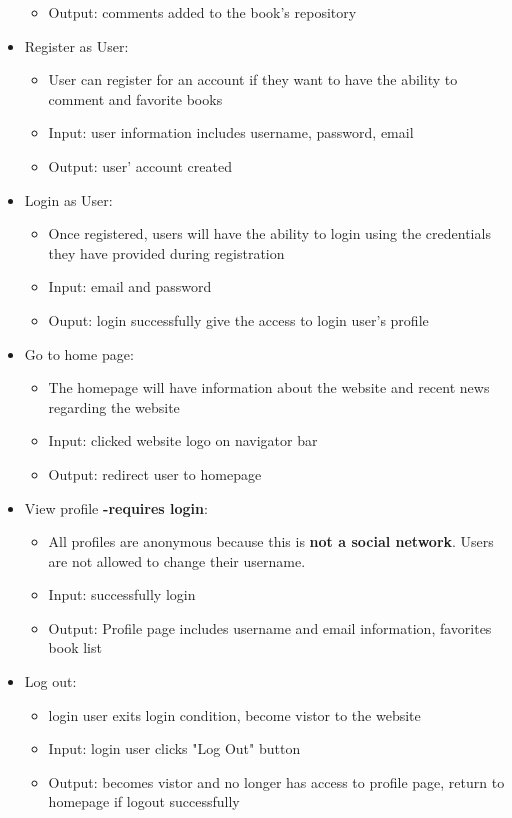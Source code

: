 \documentclass[letter, 12pt, titlepage]{article}
\begin{document}
\begin{itemize}
\begin{itemize}
			\item  Output: comments added to the book's repository
		\end{itemize}
	\item Register as User:
		\begin{itemize}
			\item  User can register for an account if they want to have the ability to comment and favorite books
			\item  Input: user information includes username, password, email
			\item  Output: user' account created
		\end{itemize}
	\item Login as User:
		\begin{itemize}
			\item  Once registered, users will have the ability to login using the credentials they have provided during registration
			\item  Input: email and password
			\item  Ouput: login successfully give the access to login user's profile 
		\end{itemize}
	\item Go to home page:
		\begin{itemize}
			\item  The homepage will have information about the website and recent news regarding the website
			\item  Input: clicked website logo on navigator bar 
			\item  Output: redirect user to homepage
		\end{itemize}
	\item View profile \textbf{-requires login}:
		\begin{itemize}
			\item  All profiles are anonymous because this is \textbf{not a social network}. Users are not allowed to change their username.
			\item  Input: successfully login
			\item  Output: Profile page includes username and email information, favorites book list
		\end{itemize}
	\item Log out:
		\begin{itemize}
			\item  login user exits login condition, become vistor to the website
			\item  Input: login user clicks "Log Out" button
			\item  Output: becomes vistor and no longer has access to profile page, return to homepage if logout successfully
		\end{itemize}
	
	\end{itemize}	
		
\end{document}
